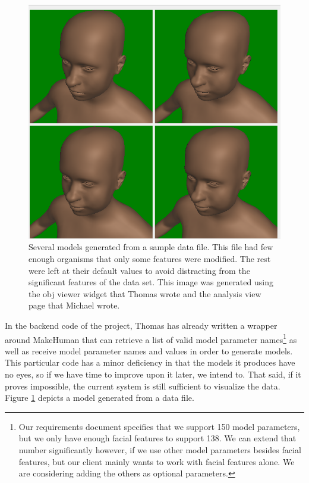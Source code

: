 \documentclass[letterpaper,10pt, onecolumn, draftclsnofoot]{IEEEtran}
\begin{document}
\begin{figure}
	\includegraphics[width=\textwidth]{analysis.PNG}
	\caption{Several models generated from a sample data file. This file had few enough organisms that only some features were modified. The rest were left at their default values to avoid distracting from the significant features of the data set. This image was generated using the obj viewer widget that Thomas wrote and the analysis view page that Michael wrote.}
	\label{fig:generated}
\end{figure}

In the backend code of the project, Thomas has already written a wrapper around MakeHuman that can retrieve a list of valid model parameter names\footnote{Our requirements document specifies that we support 150 model parameters, but we only have enough facial features to support 138. We can extend that number significantly however, if we use other model parameters besides facial features, but our client mainly wants to work with facial features alone. We are considering adding the others as optional parameters.} as well as receive model parameter names and values in order to generate models. This particular code has a minor deficiency in that the models it produces have no eyes, so if we have time to improve upon it later, we intend to. That said, if it proves impossible, the current system is still sufficient to visualize the data. Figure \ref{fig:generated} depicts a model generated from a data file.
\end{document}
